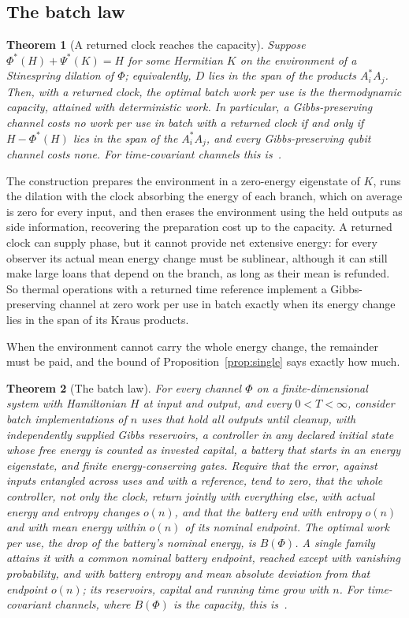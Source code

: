 \documentclass[11pt]{article}
\newtheorem{theorem}{Theorem}
\theoremstyle{definition}
\theoremstyle{remark}
\begin{document}
\subsection{The batch law}

\begin{theorem}[A returned clock reaches the capacity]\label{thm:balanced}
Suppose $\Phi^*(H)+\Psi^*(K)=H$ for some Hermitian $K$ on the environment of a Stinespring dilation of $\Phi$; equivalently, $D$ lies in the span of the products $A_i^*A_j$. Then, with a returned clock, the optimal batch work per use is the thermodynamic capacity, attained with deterministic work. In particular, a Gibbs-preserving channel costs no work per use in batch with a returned clock if and only if $H-\Phi^*(H)$ lies in the span of the $A_i^*A_j$, and every Gibbs-preserving qubit channel costs none. For time-covariant channels this is~\cite[Thm.~7.1]{FBB21}.
\end{theorem}

The construction prepares the environment in a zero-energy eigenstate of $K$, runs the dilation with the clock absorbing the energy of each branch, which on average is zero for every input, and then erases the environment using the held outputs as side information, recovering the preparation cost up to the capacity. A returned clock can supply phase, but it cannot provide net extensive energy: for every observer its actual mean energy change must be sublinear, although it can still make large loans that depend on the branch, as long as their mean is refunded. So thermal operations with a returned time reference implement a Gibbs-preserving channel at zero work per use in batch exactly when its energy change lies in the span of its Kraus products.

When the environment cannot carry the whole energy change, the remainder must be paid, and the bound of Proposition~\ref{prop:single} says exactly how much.

\begin{theorem}[The batch law]\label{thm:batchlaw}
For every channel $\Phi$ on a finite-dimensional system with Hamiltonian $H$ at input and output, and every $0<T<\infty$, consider batch implementations of $n$ uses that hold all outputs until cleanup, with independently supplied Gibbs reservoirs, a controller in any declared initial state whose free energy is counted as invested capital, a battery that starts in an energy eigenstate, and finite energy-conserving gates. Require that the error, against inputs entangled across uses and with a reference, tend to zero, that the whole controller, not only the clock, return jointly with everything else, with actual energy and entropy changes $o(n)$, and that the battery end with entropy $o(n)$ and with mean energy within $o(n)$ of its nominal endpoint. The optimal work per use, the drop of the battery's nominal energy, is $B(\Phi)$. A single family attains it with a common nominal battery endpoint, reached except with vanishing probability, and with battery entropy and mean absolute deviation from that endpoint $o(n)$; its reservoirs, capital and running time grow with $n$. For time-covariant channels, where $B(\Phi)$ is the capacity, this is~\cite[Thm.~7.1]{FBB21}.
\end{theorem}
\end{document}
